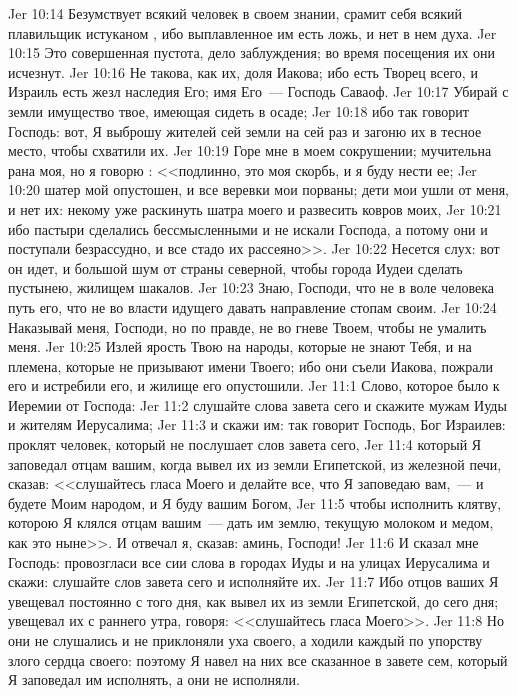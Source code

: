 \vs Jer 10:14 Безумствует всякий человек в своем знании, срамит себя всякий плавильщик истуканом , ибо выплавленное им есть ложь, и нет в нем духа.
\vs Jer 10:15 Это совершенная пустота, дело заблуждения; во время посещения их они исчезнут.
\vs Jer 10:16 Не такова, как их, доля Иакова; ибо  есть Творец всего, и Израиль есть жезл наследия Его; имя Его~--- Господь Саваоф.
\vs Jer 10:17 Убирай с земли имущество твое, имеющая сидеть в осаде;
\vs Jer 10:18 ибо так говорит Господь: вот, Я выброшу жителей сей земли на сей раз и загоню их в тесное место, чтобы схватили их.
\vs Jer 10:19 Горе мне в моем сокрушении; мучительна рана моя, но я говорю : <<подлинно, это моя скорбь, и я буду нести ее;
\vs Jer 10:20 шатер мой опустошен, и все веревки мои порваны; дети мои ушли от меня, и нет их: некому уже раскинуть шатра моего и развесить ковров моих,
\vs Jer 10:21 ибо пастыри сделались бессмысленными и не искали Господа, а потому они и поступали безрассудно, и все стадо их рассеяно>>.
\vs Jer 10:22 Несется слух: вот он идет, и большой шум от страны северной, чтобы города Иудеи сделать пустынею, жилищем шакалов.
\vs Jer 10:23 Знаю, Господи, что не в воле человека путь его, что не во власти идущего давать направление стопам своим.
\vs Jer 10:24 Наказывай меня, Господи, но по правде, не во гневе Твоем, чтобы не умалить меня.
\vs Jer 10:25 Излей ярость Твою на народы, которые не знают Тебя, и на племена, которые не призывают имени Твоего; ибо они съели Иакова, пожрали его и истребили его, и жилище его опустошили.
\vs Jer 11:1 Слово, которое было к Иеремии от Господа:
\vs Jer 11:2 слушайте слова завета сего и скажите мужам Иуды и жителям Иерусалима;
\vs Jer 11:3 и скажи им: так говорит Господь, Бог Израилев: проклят человек, который не послушает слов завета сего,
\vs Jer 11:4 который Я заповедал отцам вашим, когда вывел их из земли Египетской, из железной печи, сказав: <<слушайтесь гласа Моего и делайте все, что Я заповедаю вам,~--- и будете Моим народом, и Я буду вашим Богом,
\vs Jer 11:5 чтобы исполнить клятву, которою Я клялся отцам вашим~--- дать им землю, текущую молоком и медом, как это ныне>>. И отвечал я, сказав: аминь, Господи!
\vs Jer 11:6 И сказал мне Господь: провозгласи все сии слова в городах Иуды и на улицах Иерусалима и скажи: слушайте слов завета сего и исполняйте их.
\vs Jer 11:7 Ибо отцов ваших Я увещевал постоянно с того дня, как вывел их из земли Египетской, до сего дня; увещевал их с раннего утра, говоря: <<слушайтесь гласа Моего>>.
\vs Jer 11:8 Но они не слушались и не приклоняли уха своего, а ходили каждый по упорству злого сердца своего: поэтому Я навел на них все сказанное в завете сем, который Я заповедал им исполнять, а они не исполняли.

